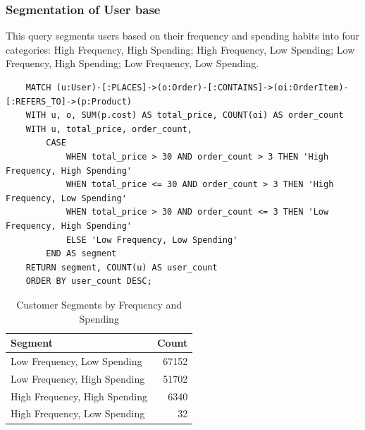 \documentclass[a4paper,12pt]{article}
\begin{document}
  \subsubsection{Segmentation of User base}
  This query segments users based on their frequency and spending habits into four categories: High Frequency, High Spending; High Frequency, Low Spending; Low Frequency, High Spending; Low Frequency, Low Spending.
  \begin{verbatim}
    MATCH (u:User)-[:PLACES]->(o:Order)-[:CONTAINS]->(oi:OrderItem)-[:REFERS_TO]->(p:Product)
    WITH u, o, SUM(p.cost) AS total_price, COUNT(oi) AS order_count
    WITH u, total_price, order_count,
        CASE 
            WHEN total_price > 30 AND order_count > 3 THEN 'High Frequency, High Spending'
            WHEN total_price <= 30 AND order_count > 3 THEN 'High Frequency, Low Spending'
            WHEN total_price > 30 AND order_count <= 3 THEN 'Low Frequency, High Spending'
            ELSE 'Low Frequency, Low Spending'
        END AS segment
    RETURN segment, COUNT(u) AS user_count
    ORDER BY user_count DESC;
  \end{verbatim}  

  \begin{table}[h!]
    \centering
    \caption{Customer Segments by Frequency and Spending}
    \label{tab:customer_segments}
    \begin{tabular}{l r}
        \toprule
        \textbf{Segment} & \textbf{Count} \\
        \midrule
        Low Frequency, Low Spending  & 67152 \\
        Low Frequency, High Spending & 51702 \\
        High Frequency, High Spending & 6340 \\
        High Frequency, Low Spending & 32 \\
        \bottomrule
    \end{tabular}
\end{table}
\end{document}
